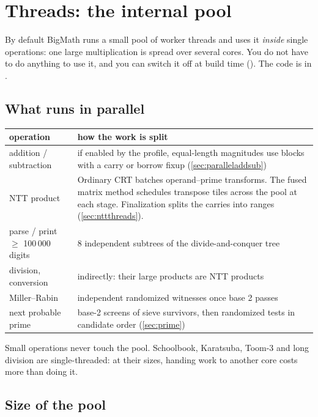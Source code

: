 \chapter{Threads: the internal pool}
\label{ch:parallel}

By default BigMath runs a small pool of worker threads and uses it \emph{inside} single
operations: one large multiplication is spread over several cores. You do not have to do
anything to use it, and you can switch it off at build time
(). The code is in .

\section{What runs in parallel}

\begin{center}
\small
\begin{tabularx}{\textwidth}{lX}
\toprule
operation & how the work is split \\
\midrule
addition / subtraction & if enabled by the profile, equal-length magnitudes use blocks
                         with a carry or borrow fixup (\cref{sec:paralleladdsub}) \\
NTT product & Ordinary CRT batches operand--prime transforms. The fused matrix method
              schedules transpose tiles across the pool at each stage. Finalization
              splits the carries into ranges (\cref{sec:nttthreads}). \\
parse / print $\ge$ 100\,000 digits & 8 independent subtrees of the divide-and-conquer tree \\
division, conversion & indirectly: their large products are NTT products \\
Miller--Rabin & independent randomized witnesses once base 2 passes \\
next probable prime & base-2 screens of sieve survivors, then randomized tests in
                      candidate order (\cref{sec:prime}) \\
\bottomrule
\end{tabularx}
\end{center}

Small operations never touch the pool. Schoolbook, Karatsuba, Toom-3 and long division are
single-threaded: at their sizes, handing work to another core costs more than doing it.

\section{Size of the pool}

